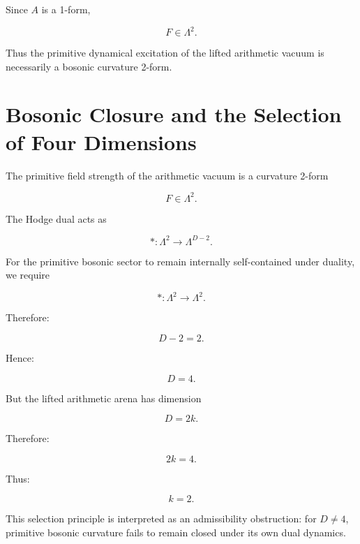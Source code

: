 \documentclass[11pt]{article}
\begin{document}
Since $A$ is a 1-form,

\begin{equation}
F \in \Lambda^2.
\end{equation}

Thus the primitive dynamical excitation of the lifted arithmetic vacuum is necessarily a bosonic curvature 2-form.

\section{Bosonic Closure and the Selection of Four Dimensions}

The primitive field strength of the arithmetic vacuum is a curvature 2-form

\begin{equation}
F \in \Lambda^2.
\end{equation}

The Hodge dual acts as

\begin{equation}
*: \Lambda^2 \to \Lambda^{D-2}.
\end{equation}

For the primitive bosonic sector to remain internally self-contained under duality, we require

\begin{equation}
*: \Lambda^2 \to \Lambda^2.
\end{equation}

Therefore:

\begin{equation}
D-2=2.
\end{equation}

Hence:

\begin{equation}
D=4.
\end{equation}

But the lifted arithmetic arena has dimension

\begin{equation}
D=2k.
\end{equation}

Therefore:

\begin{equation}
2k=4.
\end{equation}

Thus:

\begin{equation}
k=2.
\end{equation}

This selection principle is interpreted as an admissibility obstruction: for $D\neq4$, primitive bosonic curvature fails to remain closed under its own dual dynamics.
\end{document}
